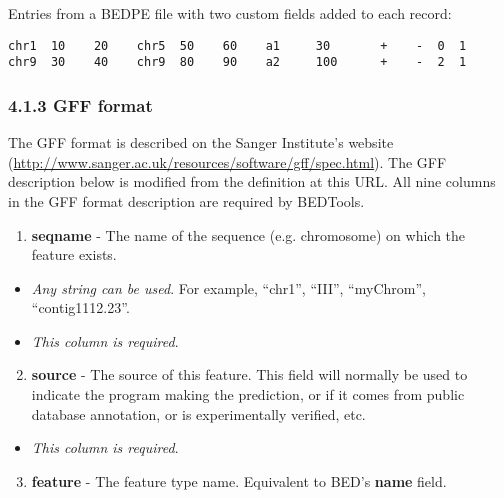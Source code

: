 \documentclass[letterpaper,10pt,english]{sphinxmanual}
\begin{document}
Entries from a BEDPE file with two custom fields added to each record:

\begin{Verbatim}[commandchars=\\\{\}]
chr1  10    20    chr5  50    60    a1     30       +    -  0  1
chr9  30    40    chr9  80    90    a2     100      +    -  2  1
\end{Verbatim}


\subsubsection{4.1.3 GFF format}
\label{content/general-usage:gff-format}
The GFF format is described on the Sanger Institute's website (\href{http://www.sanger.ac.uk/resources/software/gff/spec.html}{http://www.sanger.ac.uk/resources/software/gff/spec.html}). The GFF description below is modified from the definition at this URL. All nine columns in the GFF format description are required by BEDTools.
\begin{enumerate}
\item {} 
\textbf{seqname} - The name of the sequence (e.g. chromosome) on which the feature exists.

\end{enumerate}
\begin{itemize}
\item {} 
\emph{Any string can be used}. For example, ``chr1'', ``III'', ``myChrom'', ``contig1112.23''.

\item {} 
\emph{This column is required}.

\end{itemize}
\begin{enumerate}
\setcounter{enumi}{1}
\item {} 
\textbf{source} - The source of this feature. This field will normally be used to indicate the program making the prediction, or if it comes from public database annotation, or is experimentally verified, etc.

\end{enumerate}
\begin{itemize}
\item {} 
\emph{This column is required}.

\end{itemize}
\begin{enumerate}
\setcounter{enumi}{2}
\item {} 
\textbf{feature} - The feature type name. Equivalent to BED's \textbf{name} field.

\end{enumerate}
\end{document}
